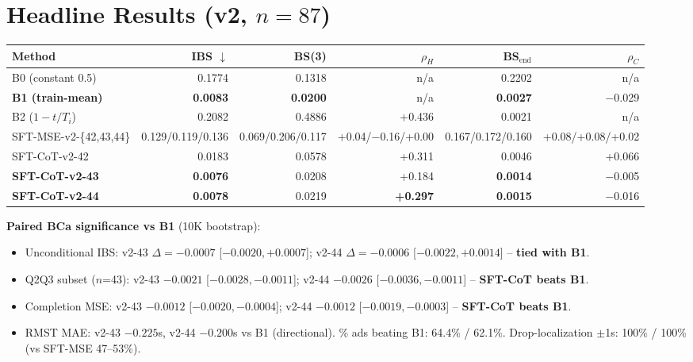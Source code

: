 \documentclass[10pt]{article}
\begin{document}
\section*{Headline Results (v2, $n=87$)}
\vspace{-2pt}
{\footnotesize
\begin{tabular}{lrrrrr}
\toprule
Method & IBS $\downarrow$ & BS(3) & $\rho_H$ & BS$_\text{end}$ & $\rho_C$ \\
\midrule
B0 (constant 0.5)        & 0.1774 & 0.1318 & n/a    & 0.2202 & n/a \\
\textbf{B1 (train-mean)} & \textbf{0.0083} & \textbf{0.0200} & n/a & \textbf{0.0027} & $-$0.029 \\
B2 ($1-t/T_i$)           & 0.2082 & 0.4886 & +0.436 & 0.0021 & n/a \\
SFT-MSE-v2-\{42,43,44\}  & 0.129/0.119/0.136 & 0.069/0.206/0.117 & +0.04/$-$0.16/+0.00 & 0.167/0.172/0.160 & +0.08/+0.08/+0.02 \\
SFT-CoT-v2-42            & 0.0183 & 0.0578 & +0.311 & 0.0046 & +0.066 \\
\textbf{SFT-CoT-v2-43}   & \textbf{0.0076} & 0.0208 & +0.184 & \textbf{0.0014} & $-$0.005 \\
\textbf{SFT-CoT-v2-44}   & \textbf{0.0078} & 0.0219 & \textbf{+0.297} & \textbf{0.0015} & $-$0.016 \\
\bottomrule
\end{tabular}}

\textbf{Paired BCa significance vs B1} (10K bootstrap):
\begin{itemize}
\item Unconditional IBS: v2-43 $\Delta=-0.0007$ [$-0.0020,+0.0007$]; v2-44 $\Delta=-0.0006$ [$-0.0022,+0.0014$] -- \textbf{tied with B1}.
\item Q2Q3 subset ($n$=43): v2-43 $-0.0021$ [$-0.0028,-0.0011$]; v2-44 $-0.0026$ [$-0.0036,-0.0011$] -- \textbf{SFT-CoT beats B1}.
\item Completion MSE: v2-43 $-0.0012$ [$-0.0020,-0.0004$]; v2-44 $-0.0012$ [$-0.0019,-0.0003$] -- \textbf{SFT-CoT beats B1}.
\item RMST MAE: v2-43 $-0.225$s, v2-44 $-0.200$s vs B1 (directional). \% ads beating B1: 64.4\% / 62.1\%.
Drop-localization $\pm$1s: 100\% / 100\% (vs SFT-MSE 47--53\%).
\end{itemize}
\end{document}
